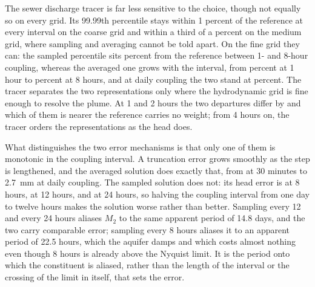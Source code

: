 \documentclass[preprint,authoryear,11pt]{elsarticle}
\begin{document}
The sewer discharge tracer is far less sensitive to the choice, though not equally so on every grid. Its 99.99th percentile stays within 1 percent of the reference at every interval on the coarse grid and within a third of a percent on the medium grid, where sampling and averaging cannot be told apart. On the fine grid they can: the sampled percentile sits  percent from the reference between 1- and 8-hour coupling, whereas the averaged one grows with the interval, from  percent at 1 hour to  percent at 8 hours, and at daily coupling the two stand at  percent. The tracer separates the two representations only where the hydrodynamic grid is fine enough to resolve the plume. At 1 and 2 hours the two departures differ by  and which of them is nearer the reference carries no weight; from 4 hours on, the tracer orders the representations as the head does.

What distinguishes the two error mechanisms is that only one of them is monotonic in the coupling interval. A truncation error grows smoothly as the step is lengthened, and the averaged solution does exactly that, from  at 30 minutes to \SI{2.7}{\milli\meter} at daily coupling. The sampled solution does not: its head error is  at 8 hours,  at 12 hours, and  at 24 hours, so halving the coupling interval from one day to twelve hours makes the solution worse rather than better. Sampling every 12 and every 24 hours aliases $M_2$ to the same apparent period of 14.8 days, and the two carry comparable error; sampling every 8 hours aliases it to an apparent period of 22.5 hours, which the aquifer damps and which costs almost nothing even though 8 hours is already above the Nyquist limit. It is the period onto which the constituent is aliased, rather than the length of the interval or the crossing of the limit in itself, that sets the error.
\end{document}
